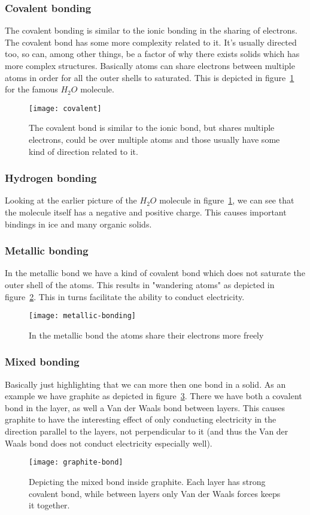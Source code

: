 \documentclass[11pt]{article}
\begin{document}
\newpage
\subsubsection{Covalent bonding}
The covalent bonding is similar to the ionic bonding in the sharing of electrons. The covalent bond has some more complexity related to it. It's usually directed too, so can, among other things, be a factor of why there exists solids which has more complex structures. Basically atoms can share electrons between multiple atoms in order for all the outer shells to saturated. This is depicted in figure~\ref{fig:covalent} for the famous $H_2O$ molecule.

\begin{figure}[!h]
	\centering
	\texttt{[image: covalent]}
	\caption{The covalent bond is similar to the ionic bond, but shares multiple electrons, could be over multiple atoms and those usually have some kind of direction related to it.}
	\label{fig:covalent}
\end{figure}

\subsubsection{Hydrogen bonding}
Looking at the earlier picture of the $H_2O$ molecule in figure~\ref{fig:covalent}, we can see that the molecule itself has a negative and positive charge. This causes important bindings in ice and many organic solids.

\newpage
\subsubsection{Metallic bonding}
In the metallic bond we have a kind of covalent bond which does not saturate the outer shell of the atoms. This results in "wandering atoms" as depicted in figure~\ref{fig:metallic-bonding}. This in turns facilitate the ability to conduct electricity. 
\begin{figure}[!h]
	\centering
	\texttt{[image: metallic-bonding]}
	\caption{In the metallic bond the atoms share their electrons more freely}
	\label{fig:metallic-bonding}
\end{figure}

\newpage
\subsubsection{Mixed bonding}
Basically just highlighting that we can more then one bond in a solid. As an example we have graphite as depicted in figure~\ref{fig:graphite-bond}. There we have both a covalent bond in the layer, as well a Van der Waals bond between layers. This causes graphite to have the interesting effect of only conducting electricity in the direction parallel to the layers, not perpendicular to it (and thus the Van der Waals bond does not conduct electricity especially well).
\begin{figure}[!h]
	\centering
	\texttt{[image: graphite-bond]}
	\caption{Depicting the mixed bond inside graphite. Each layer has strong covalent bond, while between layers only Van der Waals forces keeps it together.}
	\label{fig:graphite-bond}
\end{figure}
\newpage 
\end{document}
